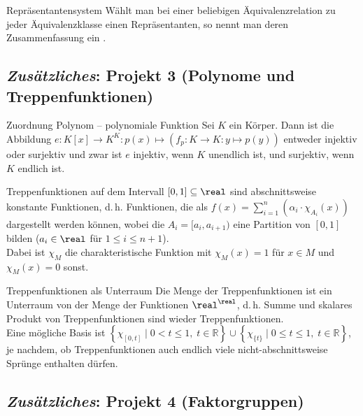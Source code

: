 \begin{Def}{Repräsentantensystem}
    Wählt man bei einer beliebigen Äquivalenzrelation zu jeder
    Äquivalenzklasse einen Repräsentanten, so nennt man deren
    Zusammenfassung ein .
\end{Def}

\subsection{%
    \emph{Zusätzliches}: Projekt 3 (Polynome und Treppenfunktionen)%
}

\begin{Satz}{Zuordnung Polynom -- polynomiale Funktion}
    Sei $K$ ein Körper.
    Dann ist die Abbildung
    $e: K[x] \rightarrow K^K: p(x) \mapsto
    (f_p: K \rightarrow K: y \mapsto p(y))$
    entweder injektiv oder surjektiv und zwar ist
    $e$ injektiv, wenn $K$ unendlich ist, und surjektiv, wenn $K$ endlich ist.
\end{Satz}

\begin{Def}{Treppenfunktionen}
     auf dem Intervall $[0, 1] \subseteq \real$
    sind abschnittsweise konstante Funktionen, d.\,h. Funktionen, die als
    $f(x) = \sum_{i=1}^n \left(\alpha_i \cdot \chi_{A_i}(x)\right)$ dargestellt
    werden können, wobei die $A_i = [a_i, a_{i+1})$ eine Partition von
    $[0, 1]$ bilden ($a_i \in \real$ für $1 \le i \le n + 1$). \\
    Dabei ist $\chi_M$ die charakteristische Funktion mit $\chi_M(x) = 1$ für
    $x \in M$ und $\chi_M(x) = 0$ sonst.
\end{Def}

\begin{Satz}{Treppenfunktionen als Unterraum}
    Die Menge der Treppenfunktionen ist ein Unterraum von der Menge der
    Funktionen $\real^\real$, d.\,h. Summe und skalares Produkt von
    Treppenfunktionen sind wieder Treppenfunktionen. \\
    Eine mögliche Basis ist
    $\left\{ \chi_{[0, t]} \;|\; 0 < t \le 1,\; t \in \mathbb{R} \right\} \cup
    \left\{ \chi_{\{t\}} \;|\; 0 \le t \le 1,\; t \in \mathbb{R} \right\}$,
    je nachdem, ob Treppenfunktionen auch endlich viele nicht-abschnittsweise
    Sprünge enthalten dürfen.
\end{Satz}

\subsection{%
    \emph{Zusätzliches}: Projekt 4 (Faktorgruppen)%
}

